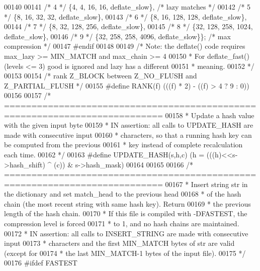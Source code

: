 \begin{DoxyCode}
00140 
00141 \textcolor{comment}{/* 4 */} \{4,    4, 16,   16, deflate\_slow\},  \textcolor{comment}{/* lazy matches */}
00142 \textcolor{comment}{/* 5 */} \{8,   16, 32,   32, deflate\_slow\},
00143 \textcolor{comment}{/* 6 */} \{8,   16, 128, 128, deflate\_slow\},
00144 \textcolor{comment}{/* 7 */} \{8,   32, 128, 256, deflate\_slow\},
00145 \textcolor{comment}{/* 8 */} \{32, 128, 258, 1024, deflate\_slow\},
00146 \textcolor{comment}{/* 9 */} \{32, 258, 258, 4096, deflate\_slow\}\}; \textcolor{comment}{/* max compression */}
00147 \textcolor{preprocessor}{#endif}
00148 
00149 \textcolor{comment}{/* Note: the deflate() code requires max\_lazy >= MIN\_MATCH and max\_chain >= 4}
00150 \textcolor{comment}{ * For deflate\_fast() (levels <= 3) good is ignored and lazy has a different}
00151 \textcolor{comment}{ * meaning.}
00152 \textcolor{comment}{ */}
00153 
00154 \textcolor{comment}{/* rank Z\_BLOCK between Z\_NO\_FLUSH and Z\_PARTIAL\_FLUSH */}
00155 \textcolor{preprocessor}{#define RANK(f) (((f) * 2) - ((f) > 4 ? 9 : 0))}
00156 
00157 \textcolor{comment}{/* ===========================================================================}
00158 \textcolor{comment}{ * Update a hash value with the given input byte}
00159 \textcolor{comment}{ * IN  assertion: all calls to UPDATE\_HASH are made with consecutive input}
00160 \textcolor{comment}{ *    characters, so that a running hash key can be computed from the previous}
00161 \textcolor{comment}{ *    key instead of complete recalculation each time.}
00162 \textcolor{comment}{ */}
00163 \textcolor{preprocessor}{#define UPDATE\_HASH(s,h,c) (h = (((h)<<s->hash\_shift) ^ (c)) & s->hash\_mask)}
00164 
00165 
00166 \textcolor{comment}{/* ===========================================================================}
00167 \textcolor{comment}{ * Insert string str in the dictionary and set match\_head to the previous head}
00168 \textcolor{comment}{ * of the hash chain (the most recent string with same hash key). Return}
00169 \textcolor{comment}{ * the previous length of the hash chain.}
00170 \textcolor{comment}{ * If this file is compiled with -DFASTEST, the compression level is forced}
00171 \textcolor{comment}{ * to 1, and no hash chains are maintained.}
00172 \textcolor{comment}{ * IN  assertion: all calls to INSERT\_STRING are made with consecutive input}
00173 \textcolor{comment}{ *    characters and the first MIN\_MATCH bytes of str are valid (except for}
00174 \textcolor{comment}{ *    the last MIN\_MATCH-1 bytes of the input file).}
00175 \textcolor{comment}{ */}
00176 \textcolor{preprocessor}{#ifdef FASTEST}

\end{DoxyCode}
